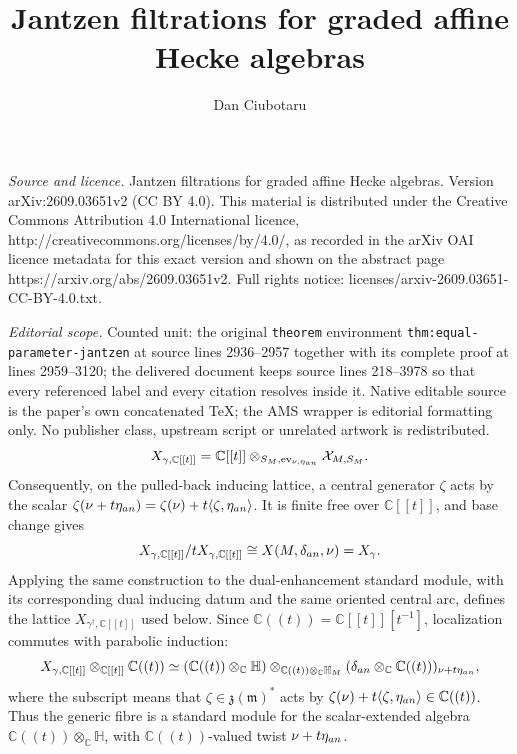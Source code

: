 \documentclass[10pt,a4paper]{amsart}
\newcommand{\Hh}{\mathbb H}
\newcommand{\C}{\mathbb C}
\newcommand{\A}{\C[[t]]}
\newcommand{\K}{\C((t))}
\begin{document}
\title[Jantzen filtrations for graded affine Hecke algebras]{Jantzen filtrations for graded affine Hecke algebras}
\author{Dan Ciubotaru}
\date{}
\maketitle
\noindent\emph{Source and licence.} Jantzen filtrations for graded affine Hecke algebras. Version arXiv:2609.03651v2 (CC BY 4.0). This material is distributed under the Creative Commons Attribution 4.0 International licence, http://creativecommons.org/licenses/by/4.0/, as recorded in the arXiv OAI licence metadata for this exact version and shown on the abstract page https://arxiv.org/abs/2609.03651v2. Full rights notice: licenses/arxiv-2609.03651-CC-BY-4.0.txt.\par\smallskip
\noindent\textit{Editorial scope.} Counted unit: the original \texttt{theorem} environment \texttt{thm:equal-parameter-jantzen} at source lines 2936--2957 together with its complete proof at lines 2959--3120; the delivered document keeps source lines 218--3978 so that every referenced label and every citation resolves inside it. Native editable source is the paper's own concatenated TeX; the AMS wrapper is editorial formatting only. No publisher class, upstream script or unrelated artwork is redistributed.
\begin{equation}\label{eq:standard-lattice-definition}
 X_{\gamma,\A}
  =\mathbb C[[t]]
    \otimes_{S_M,\operatorname{ev}_{\nu,\eta_{\rm an}}}\mathcal X_{M,S_M}.
\end{equation}
Consequently, on the pulled-back inducing lattice, a central generator
$\zeta$ acts by the scalar
$\zeta(\nu+t\eta_{\rm an})=
\zeta(\nu)+t\langle\zeta,\eta_{\rm an}\rangle$.
It is finite free over $\mathbb C[[t]]$, and base change gives
\[
 X_{\gamma,\A}/tX_{\gamma,\A}\cong X(M,\delta_{\rm an},\nu)=X_\gamma.
\]
Applying the same construction to the dual-enhancement standard module,
with its corresponding dual inducing datum and the same oriented central
arc, defines the lattice $X_{\gamma^\dagger,\A}$ used below.
Since $\K=\A[t^{-1}]$, localization commutes with parabolic induction:
\[
 X_{\gamma,\A}\otimes_{\A}\K
 \simeq
 (\K\otimes_{\mathbb C}\Hh)
 \otimes_{\K\otimes_{\mathbb C}\Hh_M}
 (\delta_{\rm an}\otimes_{\mathbb C}\K)_{\nu+t\eta_{\rm an}},
\]
where the subscript means that $\zeta\in\mathfrak z(\mathfrak m)^*$ acts by
$\zeta(\nu)+t\langle\zeta,\eta_{\rm an}\rangle\in\K$.  Thus the generic fibre is a
standard module for the scalar-extended algebra
$\K\otimes_{\mathbb C}\Hh$, with $\K$-valued twist
$\nu+t\eta_{\rm an}$.
\end{document}
